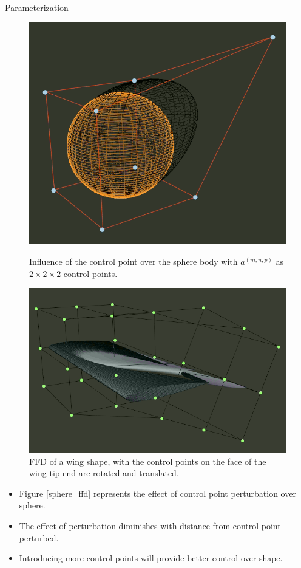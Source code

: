 \begin{frame}[allowframebreaks]{\underline{Parameterization} -}
\begin{figure}
\parbox{0.49\linewidth}
{
\centering
 \includegraphics[scale = 0.15]{figures/sphere_ffd.png}
 \caption{Influence of the control point over the sphere body with $a^{(m,n,p)}$ as $2 \times 2 \times 2$ control points.}
 \label{sphere_ffd}
}
\parbox{0.47\linewidth}
{
\centering
   \includegraphics[scale = 0.15]{figures/ffd_wing.png}
  \caption{FFD of a wing shape, with the control points on the face of the wing-tip end are rotated and translated.}
  \label{wing_ffd}
}
\end{figure}
\begin{itemize}
    \item Figure \ref{sphere_ffd} represents the effect of control point perturbation over sphere.
    \item The effect of perturbation diminishes with distance from control point perturbed.
    \item Introducing more control points will provide better control over shape.
\end{itemize}


\end{frame}
